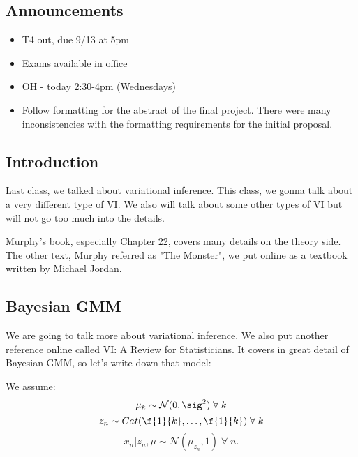 \documentclass{article}
\begin{document}

\subsection{Announcements} 
\begin{itemize}
\item T4 out, due 9/13 at 5pm
\item Exams available in office
\item OH - today 2:30-4pm (Wednesdays)
\item  Follow formatting for the abstract of the final project. There were many inconsistencies with the formatting requirements for the initial proposal.
\end{itemize} 

\subsection{Introduction}
Last class, we talked about variational inference. This class, we gonna talk about a very different type of VI. We also will talk about some other types of VI but will not go too much into the details.  \newline

Murphy's book, especially Chapter 22, covers many details on the theory side. The other text, Murphy referred as "The Monster", we put online as a textbook written by Michael Jordan.

\subsection{Bayesian GMM}
We are going to talk more about variational inference. We also put another reference online called VI: A Review for Statisticians. It covers in great detail of Bayesian GMM, so let's write down that model:
\begin{center}
\end{center}
We assume:
\[ \mu_k \sim \mathcal{N}(0,\sig^2) \;\forall\;k \]
\[ z_n \sim Cat(\f{1}{k}, \dots,\f{1}{k}) \;\forall\; k\]
\[ x_n | z_n, \mu \sim \mathcal{N}(\mu_{z_n},1) \; \forall \; n. \]
\end{document}
